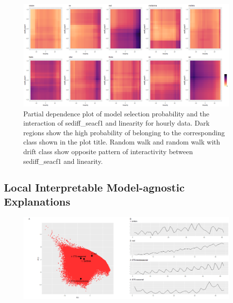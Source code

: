 \documentclass[11pt,a4paper,]{article}
\begin{document}
\begin{figure}
\centering
\includegraphics{figures/htwopdp-1.png}
\caption{\label{fig:htwopdp}Partial dependence plot of model selection probability and the interaction of sediff\_seacf1 and linearity for hourly data. Dark regions show the high probability of belonging to the corresponding class shown in the plot title. Random walk and random walk with drift class show opposite pattern of interactivity between sediff\_seacf1 and linearity.}
\end{figure}

\clearpage

\hypertarget{local-interpretable-model-agnostic-explanations}{%
\subsection{Local Interpretable Model-agnostic Explanations}\label{local-interpretable-model-agnostic-explanations}}

\begin{figure}[h]

{\centering \includegraphics{figures/quarterlylime-1} 

}

\end{figure}
\end{document}
